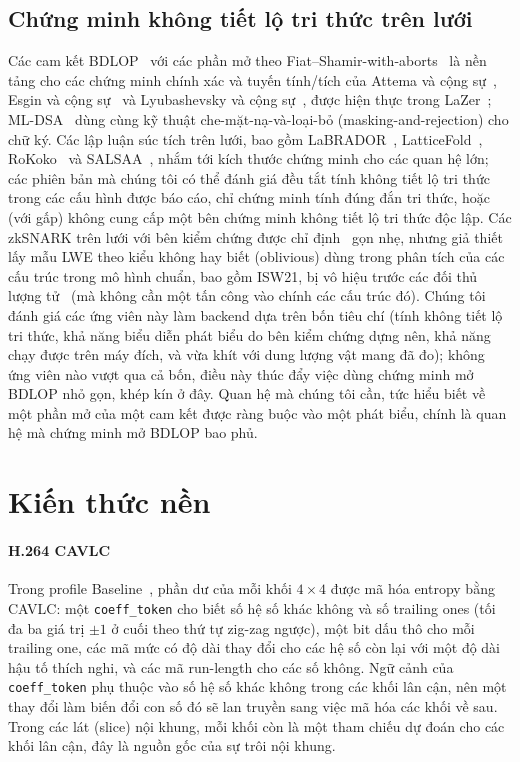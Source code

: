 \documentclass[journal]{IEEEtran}
\begin{document}
\subsection{Chứng minh không tiết lộ tri thức trên lưới}
Các cam kết BDLOP~\cite{ref:bdlop} với các phần mở theo
Fiat--Shamir-with-aborts~\cite{ref:lyu09,ref:lyu12} là nền tảng cho các chứng
minh chính xác và tuyến tính/tích của Attema và cộng sự~\cite{ref:als20}, Esgin
và cộng sự~\cite{ref:ens20} và Lyubashevsky và cộng sự~\cite{ref:lnp22}, được
hiện thực trong LaZer~\cite{ref:lazer}; ML-DSA~\cite{ref:fips204,ref:dilithium}
dùng cùng kỹ thuật che-mặt-nạ-và-loại-bỏ (masking-and-rejection) cho chữ ký.
Các lập luận súc tích trên lưới, bao gồm LaBRADOR~\cite{ref:labrador},
LatticeFold~\cite{ref:latticefold}, RoKoko~\cite{ref:rokoko} và
SALSAA~\cite{ref:salsaa}, nhắm tới kích thước chứng minh cho các quan hệ lớn;
các phiên bản mà chúng tôi có thể đánh giá đều tắt tính không tiết lộ tri thức
trong các cấu hình được báo cáo, chỉ chứng minh tính đúng đắn tri thức, hoặc
(với gấp) không cung cấp một bên chứng minh không tiết lộ tri thức độc lập. Các
zkSNARK trên lưới với bên kiểm chứng được chỉ định~\cite{ref:isw21,ref:luna}
gọn nhẹ, nhưng giả thiết lấy mẫu LWE theo kiểu không hay biết (oblivious) dùng
trong phân tích của các cấu trúc trong mô hình chuẩn, bao gồm ISW21, bị vô hiệu
trước các đối thủ lượng tử~\cite{ref:dfs24} (mà không cần một tấn công vào chính
các cấu trúc đó). Chúng tôi đánh giá các ứng viên này làm backend dựa trên bốn
tiêu chí (tính không tiết lộ tri thức, khả năng biểu diễn phát biểu do bên kiểm
chứng dựng nên, khả năng chạy được trên máy đích, và vừa khít với dung lượng vật
mang đã đo); không ứng viên nào vượt qua cả bốn, điều này thúc đẩy việc dùng
chứng minh mở BDLOP nhỏ gọn, khép kín ở đây. Quan hệ mà chúng tôi cần, tức hiểu
biết về một phần mở của một cam kết được ràng buộc vào một phát biểu, chính là
quan hệ mà chứng minh mở BDLOP bao phủ.

\section{Kiến thức nền}
\label{sec:background}

\paragraph{H.264 CAVLC}
Trong profile Baseline~\cite{ref:h264,ref:wiegand03}, phần dư của mỗi khối
$4\times4$ được mã hóa entropy bằng CAVLC: một \texttt{coeff\_token} cho biết
số hệ số khác không và số trailing ones (tối đa ba giá trị $\pm1$ ở cuối theo
thứ tự zig-zag ngược), một bit dấu thô cho mỗi trailing one, các mã mức có độ
dài thay đổi cho các hệ số còn lại với một độ dài hậu tố thích nghi, và các mã
run-length cho các số không. Ngữ cảnh của \texttt{coeff\_token} phụ thuộc vào
số hệ số khác không trong các khối lân cận, nên một thay đổi làm biến đổi con số
đó sẽ lan truyền sang việc mã hóa các khối về sau. Trong các lát (slice) nội
khung, mỗi khối còn là một tham chiếu dự đoán cho các khối lân cận, đây là nguồn
gốc của sự trôi nội khung.
\end{document}

